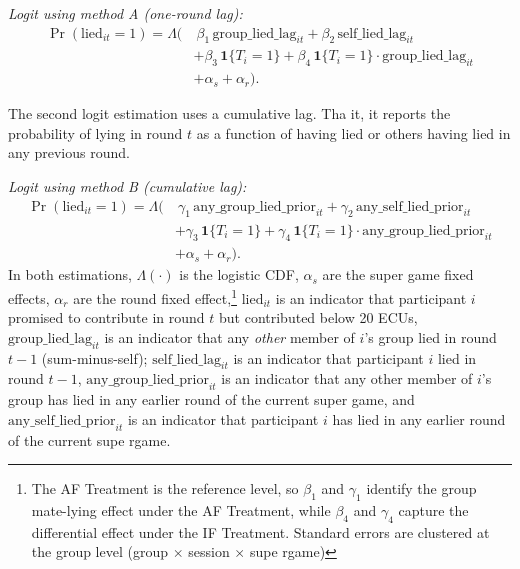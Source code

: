 \documentclass[12pt,letterpaper,english]{article}
\begin{document}
\noindent\emph{Logit using method A (one-round lag):}
\begin{align}
\Pr(\text{lied}_{it} = 1) = \Lambda\Big(
  &\ \beta_1\, \text{group\_lied\_lag}_{it}
   + \beta_2\, \text{self\_lied\_lag}_{it} \nonumber \\
  &+ \beta_3\, \mathbf{1}\{T_i = 1\}
   + \beta_4\, \mathbf{1}\{T_i = 1\} \cdot \text{group\_lied\_lag}_{it} \nonumber \\
  &+ \alpha_s + \alpha_r \Big).
\end{align}


The second logit estimation uses a cumulative lag. Tha it, it reports the probability of lying in round $t$ as a function of having lied or others having lied in any  previous round.  


\noindent\emph{Logit using method B (cumulative lag):}
\begin{align}
\Pr(\text{lied}_{it} = 1) = \Lambda\Big(
  &\ \gamma_1\, \text{any\_group\_lied\_prior}_{it}
   + \gamma_2\, \text{any\_self\_lied\_prior}_{it} \nonumber \\
  &+ \gamma_3\, \mathbf{1}\{T_i = 1\}
   + \gamma_4\, \mathbf{1}\{T_i = 1\} \cdot \text{any\_group\_lied\_prior}_{it} \nonumber \\
  &+ \alpha_s + \alpha_r \Big).
\end{align}
In both estimations, 
$\Lambda(\cdot)$ is the logistic CDF, 
$\alpha_s$ are the super game fixed effects, 
$\alpha_r$ are the round fixed effect,\footnote{The AF Treatment is the reference level, so $\beta_1$ and $\gamma_1$ identify the group mate-lying effect under the AF Treatment, while $\beta_4$ and $\gamma_4$ capture the differential effect under the IF Treatment. Standard errors are clustered at the group level (group $\times$ session $\times$ supe rgame)}
$\text{lied}_{it}$ is an indicator that participant $i$ promised to contribute in round $t$ but contributed below 20 ECUs,
$\text{group\_lied\_lag}_{it}$ is an indicator that any \emph{other} member of $i$'s group lied in round $t{-}1$ (sum-minus-self);
$\text{self\_lied\_lag}_{it}$ is an indicator that participant $i$ lied in round $t{-}1$,
$\text{any\_group\_lied\_prior}_{it}$ is an indicator that any other member of $i$'s group has lied in any earlier round of the current super game, and 
$\text{any\_self\_lied\_prior}_{it}$ is an indicator that participant $i$ has lied in any earlier round of the current supe rgame.


\begin{table}[htbp]
    \centering
    
    \caption{Pooled logit of own round-$t$ lying on groupmates' prior lying, interacted with treatment. Column (1) uses the one-round lag; column (2) uses a cumulative indicator for any prior-round lying within the current supergame. supergame and round fixed effects included; standard errors clustered at the group level. AF Treatment is the reference. The bottom two rows report the joint Wald test that the total groupmate-lying effect under IF Treatment (main coefficient plus the IF interaction) is zero.}
    \label{table:lying_contagion}
\end{table}
\end{document}
